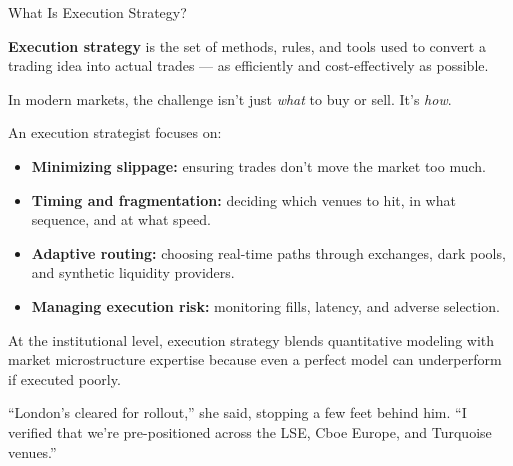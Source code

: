 \medskip

\begin{TechnicalSidebar}{What Is Execution Strategy?}

  \textbf{Execution strategy} is the set of methods, rules, and tools used to convert a trading idea into actual trades — 
  as efficiently and cost-effectively as possible.
  
  \medskip
  
  In modern markets, the challenge isn’t just \textit{what} to buy or sell. It’s \textit{how}.
  
  \medskip
  
  An execution strategist focuses on:
  
  \begin{itemize}
    \item \textbf{Minimizing slippage:} ensuring trades don’t move the market too much.
    \item \textbf{Timing and fragmentation:} deciding which venues to hit, in what sequence, and at what speed.
    \item \textbf{Adaptive routing:} choosing real-time paths through exchanges, dark pools, and synthetic liquidity 
    providers.
    \item \textbf{Managing execution risk:} monitoring fills, latency, and adverse selection.
  \end{itemize}
  
  \medskip
  
  At the institutional level, execution strategy blends quantitative modeling with market microstructure expertise 
  because even a perfect model can underperform if executed poorly.
  
\end{TechnicalSidebar}

\medskip

“London’s cleared for rollout,” she said, stopping a few feet behind him. “I verified that we’re pre-positioned 
across the LSE, Cboe Europe, and Turquoise venues.”

\medskip

